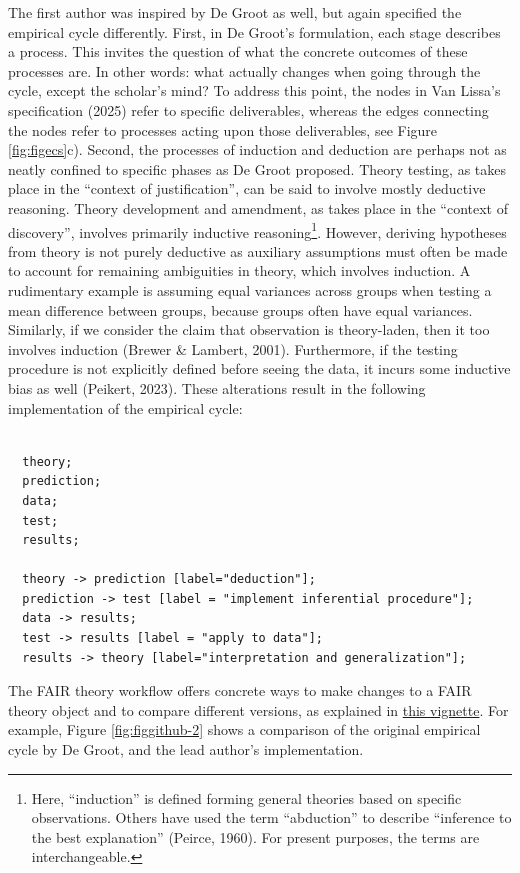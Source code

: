 \documentclass[
  man, noextraspace,floatsintext]{apa7}
\begin{document}
The first author was inspired by De Groot as well,
but again specified the empirical cycle differently.
First, in De Groot's formulation, each stage describes a process.
This invites the question of what the concrete outcomes of these processes are.
In other words: what actually changes when going through the cycle, except the scholar's mind?
To address this point, the nodes in Van Lissa's specification (2025) refer to specific deliverables, whereas the edges connecting the nodes refer to processes acting upon those deliverables, see Figure \ref{fig:figecs}c).
Second, the processes of induction and deduction are perhaps not as neatly confined to specific phases as De Groot proposed.
Theory testing, as takes place in the ``context of justification'', can be said to involve mostly deductive reasoning.
Theory development and amendment, as takes place in the ``context of discovery'', involves primarily inductive reasoning\footnote{Here, ``induction'' is defined forming general theories based on specific observations. Others have used the term ``abduction'' to describe ``inference to the best explanation'' (Peirce, 1960). For present purposes, the terms are interchangeable.}.
However, deriving hypotheses from theory is not purely deductive
as auxiliary assumptions must often be made to account for remaining ambiguities in theory, which involves induction.
A rudimentary example is assuming equal variances across groups when testing a mean difference between groups, because groups often have equal variances.
Similarly, if we consider the claim that observation is theory-laden, then it too involves induction (Brewer \& Lambert, 2001).
Furthermore, if the testing procedure is not explicitly defined before seeing the data, it incurs some inductive bias as well (Peikert, 2023).
These alterations result in the following implementation of the empirical cycle:

\begin{verbatim}

  theory;
  prediction;
  data;
  test;
  results;
  
  theory -> prediction [label="deduction"];
  prediction -> test [label = "implement inferential procedure"];
  data -> results;
  test -> results [label = "apply to data"];
  results -> theory [label="interpretation and generalization"];
\end{verbatim}

The FAIR theory workflow offers concrete ways to make changes to a FAIR theory object and to compare different versions,
as explained in \href{ADD\%20ME}{this vignette}.
For example, Figure \ref{fig:figgithub-2} shows a comparison of the original empirical cycle by De Groot, and the lead author's implementation.
\end{document}
